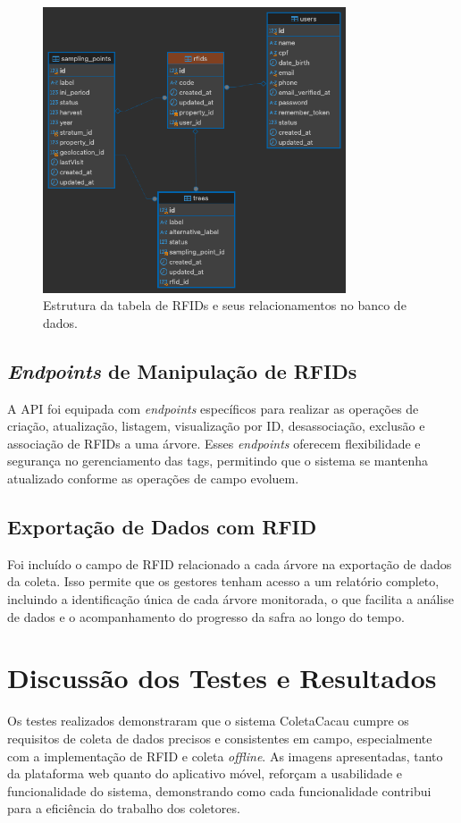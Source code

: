\begin{figure}[H]
    \centering
    \includegraphics[width=0.8\textwidth]{images/database/rfid-table.png}
    \caption{Estrutura da tabela de RFIDs e seus relacionamentos no banco de dados.} \label{fig:RfidTable}
\end{figure}

\subsection{\textit{Endpoints} de Manipulação de RFIDs}
A API foi equipada com \textit{endpoints} específicos para realizar as operações de criação, atualização, listagem, visualização por ID, desassociação, exclusão e associação de RFIDs a uma árvore. Esses \textit{endpoints} oferecem flexibilidade e segurança no gerenciamento das tags, permitindo que o sistema se mantenha atualizado conforme as operações de campo evoluem.

\subsection{Exportação de Dados com RFID}
Foi incluído o campo de RFID relacionado a cada árvore na exportação de dados da coleta. Isso permite que os gestores tenham acesso a um relatório completo, incluindo a identificação única de cada árvore monitorada, o que facilita a análise de dados e o acompanhamento do progresso da safra ao longo do tempo.

\section{Discussão dos Testes e Resultados}
Os testes realizados demonstraram que o sistema ColetaCacau cumpre os requisitos de coleta de dados precisos e consistentes em campo, especialmente com a implementação de RFID e coleta \textit{offline}. As imagens apresentadas, tanto da plataforma web quanto do aplicativo móvel, reforçam a usabilidade e funcionalidade do sistema, demonstrando como cada funcionalidade contribui para a eficiência do trabalho dos coletores.

